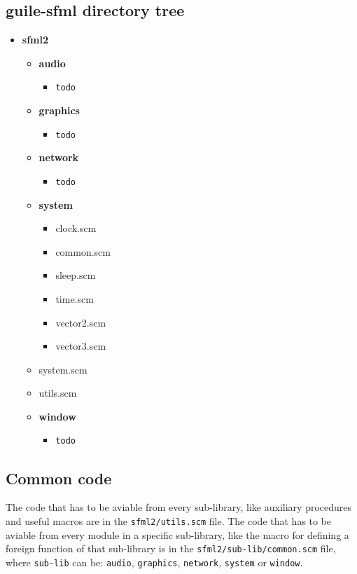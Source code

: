 \documentclass[latterpaper, leqno]{article}
\begin{document}
\subsection*{guile-sfml directory tree}
\begin{itemize}

\item \textbf{sfml2}
  \begin{itemize}

  \item \textbf{audio}
    \begin{itemize}
    \item \texttt{todo}
    \end{itemize}

  \item \textbf{graphics}
    \begin{itemize}
    \item \texttt{todo}
    \end{itemize}

  \item \textbf{network}
    \begin{itemize}
    \item \texttt{todo}
    \end{itemize}

  \item \textbf{system}
    \begin{itemize}
    \item clock.scm
    \item common.scm
    \item sleep.scm
    \item time.scm
    \item vector2.scm
    \item vector3.scm
    \end{itemize}

  \item system.scm

  \item utils.scm

  \item \textbf{window}
    \begin{itemize}
    \item \texttt{todo}
    \end{itemize}

  \end{itemize}

\end{itemize}

\subsection*{Common code}
The code that has to be aviable from every sub-library, like auxiliary procedures and useful macros are in the \texttt{sfml2/utils.scm} file. The code that has to be aviable from every module in a specific sub-library, like the macro for defining a foreign function of that sub-library is in the \texttt{sfml2/sub-lib/common.scm} file, where \texttt{sub-lib} can be: \texttt{audio}, \texttt{graphics}, \texttt{network}, \texttt{system} or \texttt{window}.
\end{document}
